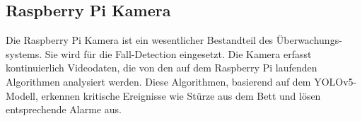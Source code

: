 
\subsection{Raspberry Pi Kamera}
Die Raspberry Pi Kamera ist ein wesentlicher Bestandteil des Überwachungs-systems. Sie wird für die Fall-Detection eingesetzt. Die Kamera erfasst kontinuierlich Videodaten, die von den auf dem Raspberry Pi laufenden Algorithmen analysiert werden. Diese Algorithmen, basierend auf dem YOLOv5-Modell, erkennen kritische Ereignisse wie Stürze aus dem Bett und lösen entsprechende Alarme aus.
